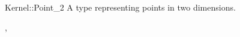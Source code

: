 \begin{ccRefConcept}{Kernel::Point_2}
A type representing points in two dimensions.

\ccRefines
{},

\ccSeeAlso
{}

\end{ccRefConcept}
